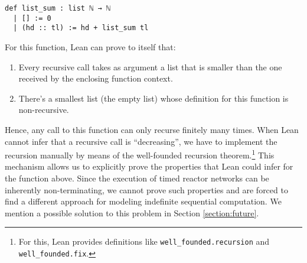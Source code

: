 \begin{lstlisting}
def list_sum : list ℕ → ℕ
  | [] := 0
  | (hd :: tl) := hd + list_sum tl
\end{lstlisting}

\noindent For this function, Lean can prove to itself that:

\begin{enumerate}
  \item Every recursive call takes as argument a list that is smaller than the one received by the enclosing function context.
  \item There's a smallest list (the empty list) whose definition for this function is non-recursive.
\end{enumerate}

\noindent Hence, any call to this function can only recurse finitely many times.
When Lean cannot infer that a recursive call is ``decreasing'', we have to implement the recursion manually by means of the well-founded recursion theorem.\footnote{
  For this, Lean provides definitions like \lstinline{well_founded.recursion} and \lstinline{well_founded.fix}.
}
This mechanism allows us to explicitly prove the properties that Lean could infer for the function above.
Since the execution of timed reactor networks can be inherently non-terminating, we cannot prove such properties and are forced to find a different approach for modeling indefinite sequential computation.
We mention a possible solution to this problem in Section \ref{section:future}.
